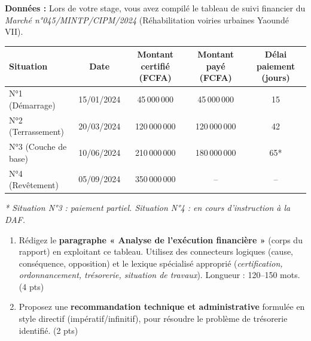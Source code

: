 \documentclass[11pt]{article}
\begin{document}
\begin{exercice}
    \textbf{Données :} Lors de votre stage, vous avez compilé le tableau de suivi financier du \textit{Marché n°045/MINTP/CIPM/2024} (Réhabilitation voiries urbaines Yaoundé VII).
    
    \begin{center}
    \begin{tabular}{|l|c|c|c|c|}
    \hline
    \textbf{Situation} & \textbf{Date} & \textbf{Montant certifié (FCFA)} & \textbf{Montant payé (FCFA)} & \textbf{Délai paiement (jours)} \\
    \hline
    N°1 (Démarrage) & 15/01/2024 & 45\,000\,000 & 45\,000\,000 & 15 \\
    N°2 (Terrassement) & 20/03/2024 & 120\,000\,000 & 120\,000\,000 & 42 \\
    N°3 (Couche de base) & 10/06/2024 & 210\,000\,000 & 180\,000\,000 & 65* \\
    N°4 (Revêtement) & 05/09/2024 & 350\,000\,000 & -- & -- \\
    \hline
    \end{tabular}
    \end{center}
    \textit{* Situation N°3 : paiement partiel. Situation N°4 : en cours d'instruction à la DAF.}
    
    \begin{enumerate}
        \item Rédigez le \textbf{paragraphe « Analyse de l'exécution financière »} (corps du rapport) en exploitant ce tableau. Utilisez des connecteurs logiques (cause, conséquence, opposition) et le lexique spécialisé approprié (\textit{certification, ordonnancement, trésorerie, situation de travaux}). Longueur : 120--150 mots. (4 pts)
        \item Proposez une \textbf{recommandation technique et administrative} formulée en style directif (impératif/infinitif), pour résoudre le problème de trésorerie identifié. (2 pts)
    \end{enumerate}
\end{exercice}
\end{document}
